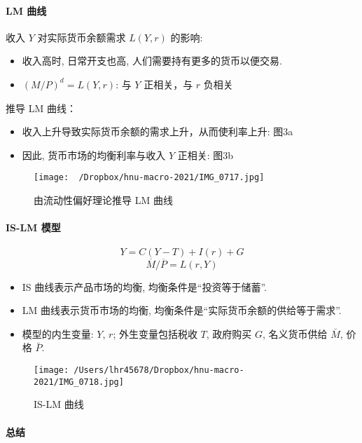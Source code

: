 \documentclass[11pt]{ctexart}
\begin{document}
\paragraph{LM 曲线}

收入 $Y$ 对实际货币余额需求 $L(Y,r)$ 的影响:

\begin{itemize}
\item
  收入高时, 日常开支也高, 人们需要持有更多的货币以便交易.
\item
  $(M/P)^d = L(Y, r)$: 与 $Y$ 正相关，与 $r$ 负相关
\end{itemize}

推导 LM 曲线：

\begin{itemize}
\item
  收入上升导致实际货币余额的需求上升，从而使利率上升: 图3a
\item
  因此, 货币市场的均衡利率与收入 $Y$ 正相关: 图3b
\end{itemize}

\begin{figure}[htbp]
\centering
\texttt{[image: ~/Dropbox/hnu-macro-2021/IMG\_0717.jpg]}
\caption{由流动性偏好理论推导 LM 曲线}
\end{figure}

\paragraph{IS-LM 模型}

\[Y = C(Y-T) + I(r) + G \tag{IS}\]
\[{\overline{M} / \overline{P}} = L(r,Y) \tag{LM}\]
\begin{itemize}
\item
  IS 曲线表示产品市场的均衡, 均衡条件是``投资等于储蓄''. 
\item
  LM 曲线表示货币市场的均衡, 均衡条件是``实际货币余额的供给等于需求''.
\item
  模型的内生变量: $Y$, $r$; 外生变量包括税收 $T$, 政府购买 $G$, 名义货币供给 $\bar{M}$, 价格 $\bar{P}$.  
\end{itemize}

\begin{figure}[htbp]
\centering
\texttt{[image: /Users/lhr45678/Dropbox/hnu-macro-2021/IMG\_0718.jpg]}
\caption{IS-LM 曲线}
\label{fig:is-lm2}
\end{figure}

\paragraph{总结}
\end{document}
